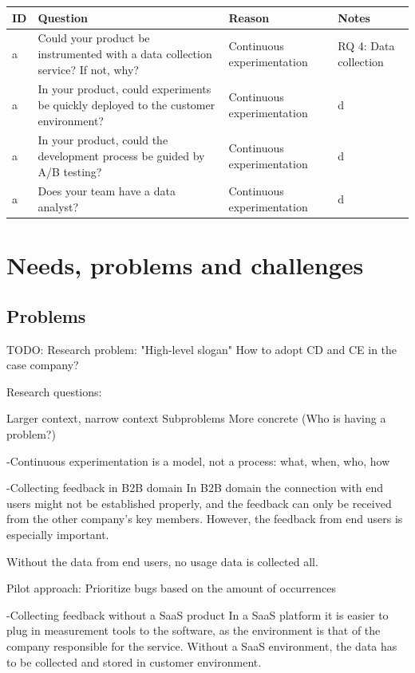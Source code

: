 \documentclass[english]{tktltiki2}
\theoremstyle{definition}
\theoremstyle{remark}
\begin{document}
\begin{center}
    \begin{tabular}{ | l | l | l | p{5cm} |}
    \hline
    ID & Question & Reason & Notes \\ \hline
    a & Could your product be instrumented with a data collection service? If not, why? & Continuous experimentation & RQ 4: Data collection \\ \hline
    a & In your product, could experiments be quickly deployed to the customer environment? & Continuous experimentation & d \\ \hline
    a & In your product, could the development process be guided by A/B testing? & Continuous experimentation & d \\ \hline
    a & Does your team have a data analyst? & Continuous experimentation & d \\ \hline
    \hline
    \end{tabular}
\end{center}

\section{Needs, problems and challenges}

\subsection{Problems} %

TODO:
Research problem: "High-level slogan"
How to adopt CD and CE in the case company?

Research questions:

Larger context, narrow context
Subproblems
More concrete (Who is having a problem?)

-Continuous experimentation is a model, not a process: what, when, who, how

-Collecting feedback in B2B domain
  In B2B domain the connection with end users might not be established properly, and the feedback can only be received from the other company's key members. However, the feedback from end users is especially important. 

  Without the data from end users, no usage data is collected all. 

  Pilot approach: Prioritize bugs based on the amount of occurrences

-Collecting feedback without a SaaS product
  In a SaaS platform it is easier to plug in measurement tools to the software, as the environment is that of the company responsible for the service. Without a SaaS environment, the data has to be collected and stored in customer environment. 
\end{document}

